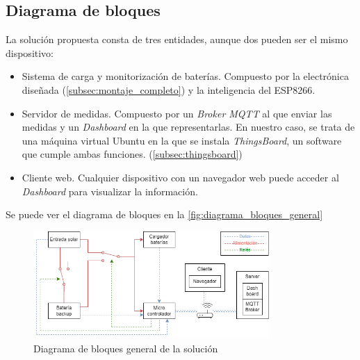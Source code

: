 \subsection{Diagrama de bloques}

La solución propuesta consta de tres entidades, aunque dos pueden ser el mismo dispositivo: \begin{itemize}
    \item Sistema de carga y monitorización de baterías. Compuesto por la electrónica diseñada (\autoref{subsec:montaje_completo}) y la inteligencia del ESP8266. 
    \item Servidor de medidas. Compuesto por un \textit{Broker MQTT} al que enviar las medidas y un \textit{Dashboard} en la que representarlas. En nuestro caso, se trata de una máquina virtual Ubuntu en la que se instala \textit{ThingsBoard}, un software que cumple ambas funciones. (\autoref{subsec:thingsboard})
    \item Cliente web. Cualquier dispositivo con un navegador web puede acceder al \textit{Dashboard} para visualizar la información.
\end{itemize}

Se puede ver el diagrama de bloques en la \autoref{fig:diagrama_bloques_general}

\begin{figure}[H]
    \centering
    \includegraphics[width=0.8\textwidth]{images/2-hardware/bloquesGeneral.png}
    \caption{Diagrama de bloques general de la solución}
    \label{fig:diagrama_bloques_general}
\end{figure}
